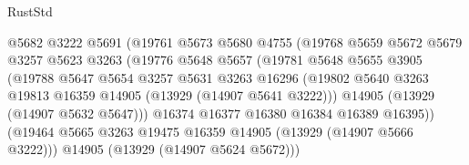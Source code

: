 \begin{lexlean}{RustStd}
\begin{coremodule}
                                    @5682
                                    @3222
                                    @5691
                                    (@19761
                                      @5673
                                      @5680
                                      @4755
                                      (@19768
                                        @5659
                                        @5672
                                        @5679
                                        @3257
                                        @5623
                                        @3263
                                        (@19776
                                          @5648
                                          @5657
                                          (@19781
                                            @5648
                                            @5655
                                            @3905
                                            (@19788
                                              @5647
                                              @5654
                                              @3257
                                              @5631
                                              @3263
                                              @16296
                                              (@19802
                                                @5640
                                                @3263
                                                @19813
                                                @16359
                                                @14905
                                                (@13929 (@14907 @5641 @3222)))
                                              @14905
                                              (@13929 (@14907 @5632 @5647)))
                                            @16374
                                            @16377
                                            @16380
                                            @16384
                                            @16389
                                            @16395))
                                        (@19464
                                          @5665
                                          @3263
                                          @19475
                                          @16359
                                          @14905
                                          (@13929 (@14907 @5666 @3222)))
                                        @14905
                                        (@13929 (@14907 @5624 @5672)))

\end{coremodule}
\end{lexlean}
